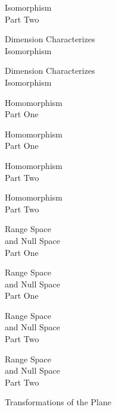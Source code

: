 \documentclass{titlescreen}
\begin{document}
% 
\begin{videotitle}
  Isomorphism  \\[1ex]
  Part Two
\end{videotitle}
\begin{videoend}
  Dimension Characterizes \\[0.5ex]
  Isomorphism
\end{videoend}

\begin{videotitle}
  Dimension Characterizes \\[0.5ex]
  Isomorphism
\end{videotitle}
\begin{videoend}
  Homomorphism  \\[1ex]
  Part One
\end{videoend}

\begin{videotitle}
  Homomorphism  \\[1ex]
  Part One
\end{videotitle}
\begin{videoend}
  Homomorphism  \\[1ex]
  Part Two
\end{videoend}

%
\begin{videotitle}
  Homomorphism  \\[1ex]
  Part Two
\end{videotitle}
\begin{videoend}
  Range Space  \\[0.5ex]
  and Null Space  \\[1ex]
  Part One
\end{videoend}

\begin{videotitle}
  Range Space  \\[0.5ex]
  and Null Space  \\[1ex]
  Part One
\end{videotitle}
\begin{videoend}
  Range Space  \\[0.5ex]
  and Null Space  \\[1ex]
  Part Two
\end{videoend}

%
\begin{videotitle}
  Range Space  \\[0.5ex]
  and Null Space  \\[1ex]
  Part Two
\end{videotitle}
\begin{videoend}
  Transformations of the Plane
\end{videoend}
\end{document}
